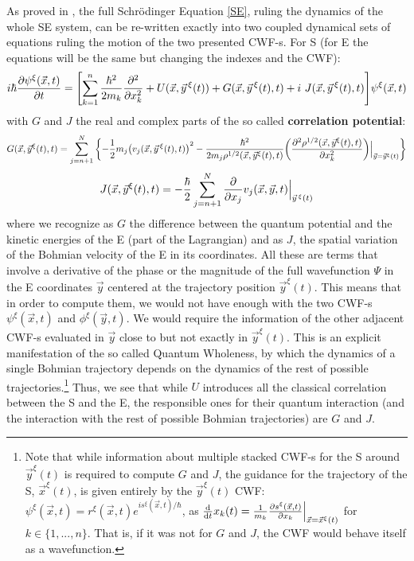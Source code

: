 \documentclass[11pt, a4paper]{article} %
\begin{document}
As proved in \cite{GJ}, the full Schrödinger Equation \eqref{SE}, ruling the dynamics of the whole SE system, can be re-written exactly into two coupled dynamical sets of equations ruling the motion of the two presented CWF-s. For S (for E the equations will be the same but changing the indexes and the CWF):
\begin{equation}\label{SE.GJ}
i \hbar \pdv{\psi^\xi (\vec{x},t)}{t} = \qty[\sum_{k=1}^n\frac{\hbar^2}{2m_k} \pdv[2]{}{x_k} +  U(\vec{x}, \vec{y}^{\, \xi}(t)) + G(\vec{x}, \vec{y}^{\, \xi}(t),t)+i\ J(\vec{x}, \vec{y}^{\, \xi}(t),t)] \psi^\xi (\vec{x},t)
\end{equation}
with $G$ and $J$ the real and complex parts of the so called {\bf correlation potential}:
\begin{equation}\label{G.Bohm}
G(\vec{x},\vec{y}^\xi(t),t)=\sum_{j=n+1}^N\qty{-\frac{1}{2}m_j\qty(v_j(\vec{x},\vec{y}^{\, \xi}(t),t))^2-\frac{\hbar^2}{2m_j\rho^{1/2}(\vec{x},\vec{y}^\xi(t),t)}\qty(\pdv[2]{\rho^{1/2}(\vec{x},\vec{y}^\xi(t),t)}{x_k})\Big\rvert_{\vec{y}=\vec{y}^\xi(t)} }
\end{equation}
\begin{equation}\label{J.Bohm}
J(\vec{x},\vec{y}^\xi(t),t)=-\frac{\hbar}{2}\sum_{j=n+1}^N\pdv{}{x_j}v_j(\vec{x},\vec{y},t)\Big\rvert_{\vec{y}^{\, \xi}(t)}
\end{equation}
where we recognize as $G$ the difference between the quantum potential and the kinetic energies of the E (part of the Lagrangian) and as $J$, the spatial variation of the Bohmian velocity of the E in its coordinates. All these are terms that involve a derivative of the phase or the magnitude of the full wavefunction $\Psi$ in the E coordinates $\vec{y}$ centered at the trajectory position $\vec{y}^\xi(t)$. This means that in order to compute them, we would not have enough with the two CWF-s $\psi^\xi(\vec{x},t)$ and $\phi^\xi(\vec{y},t)$. We would require the information of the other adjacent CWF-s evaluated in $\vec{y}$ close to but not exactly in $\vec{y}^\xi(t)$. This is an explicit manifestation of the so called Quantum Wholeness, by which the dynamics of a single Bohmian trajectory depends on the dynamics of the rest of possible trajectories.\footnote{Note that while information about multiple stacked CWF-s for the S around $\vec{y}^\xi(t)$ is required to compute $G$ and $J$, the guidance for the trajectory of the S, $\vec{x}^\xi(t)$, is given entirely by the $\vec{y}^\xi(t)$ CWF: $\psi^\xi (\vec{x},t)=r^\xi(\vec{x},t)e^{is^\xi(\vec{x},t)/\hbar}$, as $\dv{}{t}x_k(t)=\frac{1}{m_k}\pdv{s^\xi(\vec{x},t)}{x_k}\Big\rvert_{\vec{x}=\vec{x}^\xi(t)}$ for $k\in\{1,...,n\}$. That is, if it was not for $G$ and $J$, the CWF would behave itself as a wavefunction.} Thus, we see that while $U$ introduces all the classical correlation between the S and the E, the responsible ones for their quantum interaction (and the interaction with the rest of possible Bohmian trajectories) are $G$ and $J$.
\end{document}
